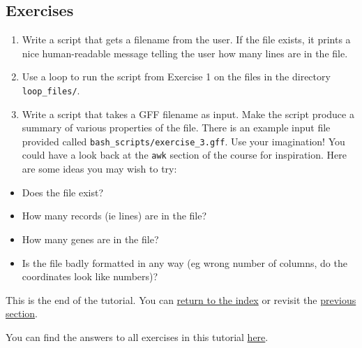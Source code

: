 \documentclass[11pt]{article}
\providecommand{\tightlist}{%
      \setlength{\itemsep}{0pt}\setlength{\parskip}{0pt}}
\begin{document}
    \hypertarget{exercises}{%
\subsection{Exercises}\label{exercises}}

\begin{enumerate}
\def\labelenumi{\arabic{enumi}.}
\tightlist
\item
  Write a script that gets a filename from the user. If the file exists,
  it prints a nice human-readable message telling the user how many
  lines are in the file.
\item
  Use a loop to run the script from Exercise 1 on the files in the
  directory \texttt{loop\_files/}.
\item
  Write a script that takes a GFF filename as input. Make the script
  produce a summary of various properties of the file. There is an
  example input file provided called
  \texttt{bash\_scripts/exercise\_3.gff}. Use your imagination! You
  could have a look back at the \texttt{awk} section of the course for
  inspiration. Here are some ideas you may wish to try:
\end{enumerate}

\begin{itemize}
\tightlist
\item
  Does the file exist?
\item
  How many records (ie lines) are in the file?
\item
  How many genes are in the file?
\item
  Is the file badly formatted in any way (eg wrong number of columns, do
  the coordinates look like numbers)?
\end{itemize}

This is the end of the tutorial. You can \href{index.ipynb}{return to
the index} or revisit the \href{awk.ipynb}{previous section}.

You can find the answers to all exercises in this tutorial
\href{answers.ipynb}{here}.


\end{document}
